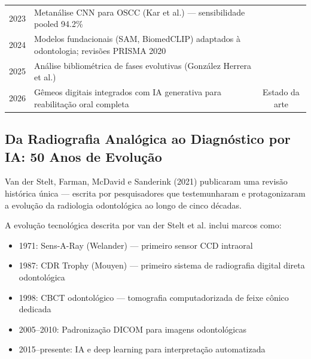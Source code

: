 \begin{table}[H]
\begin{tabularx}{\textwidth}{cXc}
    2023 & Metanálise CNN para OSCC (Kar et al.) — sensibilidade pooled 94.2\% & \cite{ODT-010} \\
    2024 & Modelos fundacionais (SAM, BiomedCLIP) adaptados à odontologia; revisões PRISMA 2020 & \cite{DL-ODT-017, DL-ODT-018} \\
    2025 & Análise bibliométrica de fases evolutivas (González Herrera et al.) & \cite{ODT-005} \\
    2026 & Gêmeos digitais integrados com IA generativa para reabilitação oral completa & Estado da arte \\
    \bottomrule
  \end{tabularx}
\end{table}

\subsection{Da Radiografia Analógica ao Diagnóstico por IA: 50 Anos de Evolução}

Van der Stelt, Farman, McDavid e Sanderink (2021) \cite{ODT-063} publicaram uma revisão histórica única — escrita por pesquisadores que testemunharam e protagonizaram a evolução da radiologia odontológica ao longo de cinco décadas.


A evolução tecnológica descrita por van der Stelt et al. inclui marcos como:

\begin{itemize}
    \item 1971: Sens-A-Ray (Welander) — primeiro sensor CCD intraoral
    \item 1987: CDR Trophy (Mouyen) — primeiro sistema de radiografia digital direta odontológica
    \item 1998: CBCT odontológico — tomografia computadorizada de feixe cônico dedicada
    \item 2005--2010: Padronização DICOM para imagens odontológicas
    \item 2015--presente: IA e deep learning para interpretação automatizada
\end{itemize}


